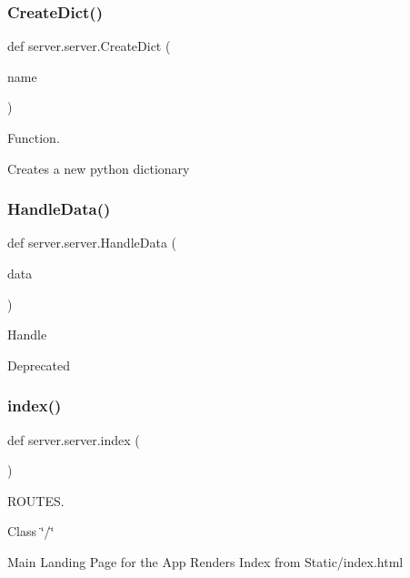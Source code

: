 \subsubsection{\texorpdfstring{Create\+Dict()}{CreateDict()}}
{\footnotesize\ttfamily def server.\+server.\+Create\+Dict (\begin{DoxyParamCaption}\item[{}]{name }\end{DoxyParamCaption})}



Function. 

Creates a new python dictionary \mbox{\label{namespaceserver_1_1server_a59e9bd350bd3f6864626e826a5d07e61}} 
\subsubsection{\texorpdfstring{Handle\+Data()}{HandleData()}}
{\footnotesize\ttfamily def server.\+server.\+Handle\+Data (\begin{DoxyParamCaption}\item[{}]{data }\end{DoxyParamCaption})}



Handle 

Deprecated \mbox{\label{namespaceserver_1_1server_ab3d96b92729f42de2866e0cb876a0a71}} 
\subsubsection{\texorpdfstring{index()}{index()}}
{\footnotesize\ttfamily def server.\+server.\+index (\begin{DoxyParamCaption}{ }\end{DoxyParamCaption})}



R\+O\+U\+T\+ES. 

Class \char`\"{}/\char`\"{}

Main Landing Page for the App Renders Index from Static/index.\+html \mbox{\label{namespaceserver_1_1server_a83a8086e94730016efda959e40b9cfaf}} 
